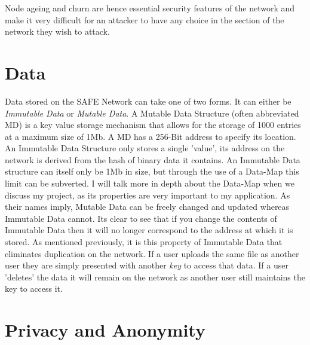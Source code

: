 Node ageing and churn are hence essential security features of the network and make it very difficult for an attacker to have any choice in the section of the network they wish to attack.

\section{Data}

Data stored on the SAFE Network can take one of two forms. It can either be \textit{Immutable Data} or \textit{Mutable Data}. A Mutable Data Structure (often abbreviated MD) is a key value storage mechanism that allows for the storage of 1000 entries at a maximum size of 1Mb. A MD has a 256-Bit address to specify its location. An Immutable Data Structure only stores a single 'value', its address on the network is derived from the hash of binary data it contains. An Immutable Data structure can itself only be 1Mb in size, but through the use of a Data-Map this limit can be subverted. I will talk more in depth about the Data-Map when we discuss my project, as its properties are very important to my application. As their names imply, Mutable Data can be freely changed and updated whereas Immutable Data cannot. Its clear to see that if you change the contents of Immutable Data then it will no longer correspond to the address at which it is stored. As mentioned previously, it is this property of Immutable Data that eliminates duplication on the network. If a user uploads the same file as another user they are simply presented with another \textit{key} to access that data. If a user 'deletes' the data it will remain on the network as another user still maintains the key to access it.

\section{Privacy and Anonymity}
